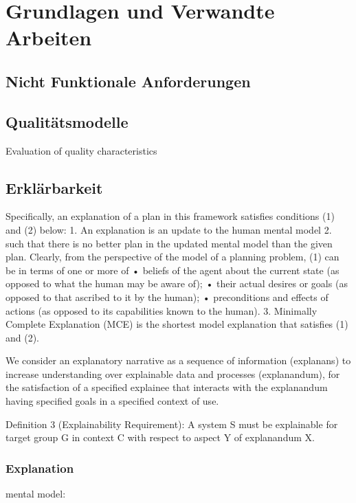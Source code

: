 \chapter{Grundlagen und Verwandte Arbeiten}

\section{Nicht Funktionale Anforderungen}

\cite{chung2009non}

\cite{schneider2012abenteuer}

\section{Qualitätsmodelle}

\cite{schneider2012abenteuer}

Evaluation of quality characteristics

\section{Erklärbarkeit}

Specifically, an explanation of a plan in this framework satisfies conditions (1) and (2) below: 1. An explanation is an update to the human mental model 2. such that there is no better plan in the updated mental model than the given plan. Clearly, from the perspective of the model of a planning problem, (1) can be in terms of one or more of • beliefs of the agent about the current state (as opposed to what the human may be aware of); • their actual desires or goals (as opposed to that ascribed to it by the human); • preconditions and effects of actions (as opposed to its capabilities known to the human). 3. Minimally Complete Explanation (MCE) is the shortest model explanation that satisfies (1) and (2). \cite{zahedi_towards_2019}

We consider an explanatory narrative as a sequence of information (explanans) to increase understanding over explainable data and processes (explanandum), for the satisfaction of a specified explainee that interacts with the explanandum having specified goals in a specified context of use. \cite{sovrano_modelling_2020}

\cite{chazette_end-users_nodate}

\cite{chazette2020explainability}

Definition 3 (Explainability Requirement): A system S must be explainable for target group G in context C with respect to aspect Y of explanandum X. \cite{kohl_explainability_2019}

\label{02_basics:explainable_system}

\label{02_basics:explainability}

\label{02_basics:quality_quaracteristic}

\subsection{Explanation}

\cite{chazette_knowledge_nodate}

\cite{kohl_explainability_2019}

mental model: \cite{chi_three_nodate}